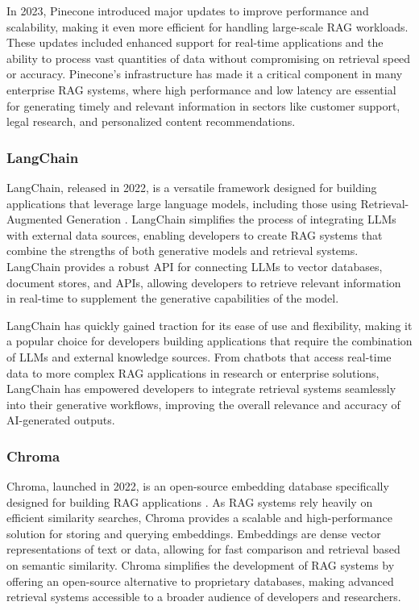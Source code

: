 In 2023, Pinecone introduced major updates to improve performance and scalability, making it even more efficient for handling large-scale RAG workloads. 
These updates included enhanced support for real-time applications and the ability to process vast quantities of data without compromising on retrieval speed or accuracy. 
Pinecone's infrastructure has made it a critical component in many enterprise RAG systems, where high performance and low latency are essential for generating timely and relevant information in sectors like customer support, legal research, and personalized content recommendations.

\subsubsection{LangChain}

LangChain, released in 2022, is a versatile framework designed for building applications that leverage large language models, including those using Retrieval-Augmented Generation \cite{LangChain}. 
LangChain simplifies the process of integrating LLMs with external data sources, enabling developers to create RAG systems that combine the strengths of both generative models and retrieval systems. 
LangChain provides a robust API for connecting LLMs to vector databases, document stores, and APIs, allowing developers to retrieve relevant information in real-time to supplement the generative capabilities of the model.

LangChain has quickly gained traction for its ease of use and flexibility, making it a popular choice for developers building applications that require the combination of LLMs and external knowledge sources. 
From chatbots that access real-time data to more complex RAG applications in research or enterprise solutions, LangChain has empowered developers to integrate retrieval systems seamlessly into their generative workflows, improving the overall relevance and accuracy of AI-generated outputs.

\subsubsection{Chroma}

Chroma, launched in 2022, is an open-source embedding database specifically designed for building RAG applications \cite{Chroma}. 
As RAG systems rely heavily on efficient similarity searches, Chroma provides a scalable and high-performance solution for storing and querying embeddings. 
Embeddings are dense vector representations of text or data, allowing for fast comparison and retrieval based on semantic similarity. 
Chroma simplifies the development of RAG systems by offering an open-source alternative to proprietary databases, making advanced retrieval systems accessible to a broader audience of developers and researchers.

